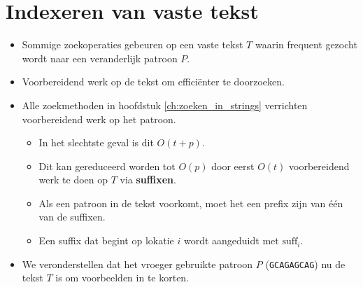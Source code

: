 \newcommand{\suffix}[1]{$\text{suff}_{#1}$}

\chapter{Indexeren van vaste tekst}

\begin{itemize}
    \item Sommige zoekoperaties gebeuren op een vaste tekst $T$ waarin frequent gezocht wordt naar een veranderlijk patroon $P$.
    \item Voorbereidend werk op de tekst om efficiënter te doorzoeken.
    \item Alle zoekmethoden in hoofdstuk \ref{ch:zoeken_in_strings} verrichten voorbereidend werk op het patroon.
    \begin{itemize}
        \item In het slechtste geval is dit $O(t + p)$.
        \item Dit kan gereduceerd worden tot $O(p)$ door eerst $O(t)$ voorbereidend werk te doen op $T$ via \textbf{suffixen}.
        \item Als een patroon in de tekst voorkomt, moet het een prefix zijn van één van de suffixen.
        \item Een suffix dat begint op lokatie $i$ wordt aangeduidt met \suffix{i}.
    \end{itemize}
    \item We veronderstellen dat het vroeger gebruikte patroon $P$ (\texttt{GCAGAGCAG}) nu de tekst $T$ is om voorbeelden in te korten.
\end{itemize}


